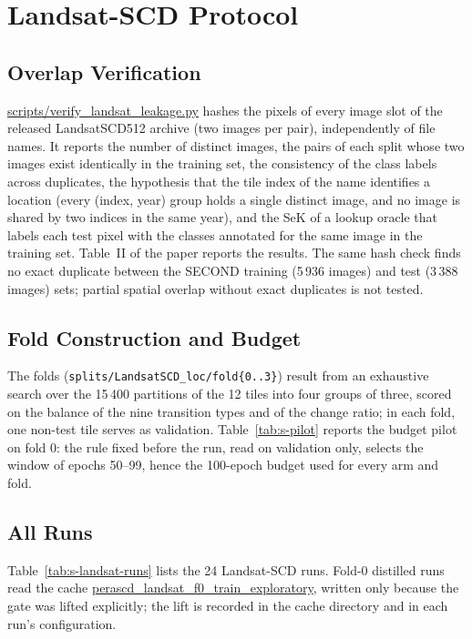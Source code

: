 \documentclass[journal,onecolumn,11pt]{IEEEtran}
\begin{document}


\section{Landsat-SCD Protocol}
\subsection{Overlap Verification}
\url{scripts/verify_landsat_leakage.py} hashes the pixels of every image slot of the
released LandsatSCD512 archive (two images per pair), independently of file names. It reports
the number of distinct images, the pairs of each split whose two images exist identically in the
training set, the consistency of the class labels across duplicates, the hypothesis that the tile
index of the name identifies a location (every (index, year) group holds a single distinct image,
and no image is shared by two indices in the same year), and the SeK of a lookup oracle that
labels each test pixel with the classes annotated for the same image in the training set.
Table~II of the paper reports the results. The same hash check finds no exact duplicate between
the SECOND training (5\,936 images) and test (3\,388 images) sets; partial spatial overlap without
exact duplicates is not tested.

\subsection{Fold Construction and Budget}
The folds (\texttt{splits/LandsatSCD\_loc/fold\{0..3\}}) result from an exhaustive search over
the 15\,400 partitions of the 12 tiles into four groups of three, scored on the balance of the nine
transition types and of the change ratio; in each fold, one non-test tile serves as validation.
Table~\ref{tab:s-pilot} reports the budget pilot on fold 0: the rule fixed before the run, read on
validation only, selects the window of epochs 50--99, hence the 100-epoch budget used for every
arm and fold.



\subsection{All Runs}
Table~\ref{tab:s-landsat-runs} lists the 24 Landsat-SCD runs. Fold-0 distilled runs read the cache
\url{perascd_landsat_f0_train_exploratory}, written only because the gate was lifted
explicitly; the lift is recorded in the cache directory and in each run's configuration.
\end{document}
